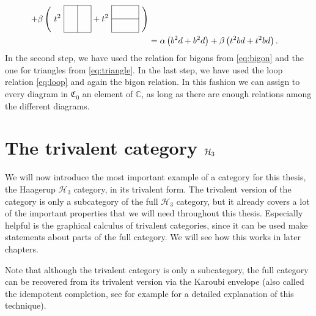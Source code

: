 \begin{align}
		+\beta\left(\ t^2\ 
		\begin{tikzpicture}[scale=0.7,baseline={([yshift=-3pt]current bounding box.center)}]
		\draw (0.5,-0.3) to (0.5,1.3);
		\draw (-0.3,-0.3) to (-0.3,1.3) to (1.3,1.3) to (1.3,-0.3) to (-0.3,-0.3);
		\end{tikzpicture}+t^2\ 
		\begin{tikzpicture}[scale=0.7,baseline={([yshift=-3pt]current bounding box.center)}]
		\draw (-0.3,0.5) to (1.3,0.5);
		\draw (-0.3,-0.3) to (-0.3,1.3) to (1.3,1.3) to (1.3,-0.3) to (-0.3,-0.3);
		\end{tikzpicture}\ \right)\\
		&=
		\alpha\left(b^2 d +b^2 d\right)
		+\beta\left(t^2 bd+t^2 bd\right).
	\end{align}
In the second step, we have used the relation for bigons from \cref{eq:bigon} and the one for triangles from \cref{eq:triangle}. In the last step, we have used the loop relation \cref{eq:loop} and again the bigon relation. In this fashion we can assign to every diagram in $\mathfrak{C}_0$ an element of $\mathbb{C}$, as long as there are enough relations among the different diagrams.
	
\section{The trivalent category ${\mathcal{H}_3}$}
\label{sec:H3triv}

	We will now introduce the most important example of a category for this thesis, the Haagerup $\mathcal{H}_3$ category, in its trivalent form. The trivalent version of the category is only a subcategory of the full $\mathcal{H}_3$ category, but it already covers a lot of the important properties that we will need throughout this thesis. Especially helpful is the graphical calculus of trivalent categories, since it can be used make statements about parts of the full category. We will see how this works in later chapters.
	
	Note that although the trivalent category is only a subcategory, the full category can be recovered from its trivalent version via the Karoubi envelope (also called the idempotent completion, see for example \cite{Morrison2010} for a detailed explanation of this technique).
	
